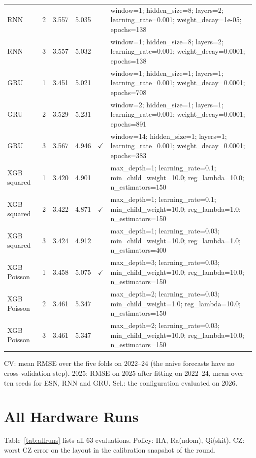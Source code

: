 \documentclass[journal]{IEEEtran}
\begin{document}
\begin{table}[t]
\begin{tabular}{@{}llcccp{11.4cm}@{}}
RNN & 2 & 3.557 & 5.035 &  & window=1; hidden\_size=8; layers=2; learning\_rate=0.001; weight\_decay=1e-05; epochs=138 \\
RNN & 3 & 3.557 & 5.032 &  & window=1; hidden\_size=8; layers=2; learning\_rate=0.001; weight\_decay=0.0001; epochs=138 \\
GRU & 1 & 3.451 & 5.021 &  & window=1; hidden\_size=1; layers=1; learning\_rate=0.001; weight\_decay=0.0001; epochs=708 \\
GRU & 2 & 3.529 & 5.231 &  & window=2; hidden\_size=1; layers=1; learning\_rate=0.001; weight\_decay=0.0001; epochs=891 \\
GRU & 3 & 3.567 & 4.946 & $\checkmark$ & window=14; hidden\_size=1; layers=1; learning\_rate=0.001; weight\_decay=0.0001; epochs=383 \\
XGB squared & 1 & 3.420 & 4.901 &  & max\_depth=1; learning\_rate=0.1; min\_child\_weight=10.0; reg\_lambda=10.0; n\_estimators=150 \\
XGB squared & 2 & 3.422 & 4.871 & $\checkmark$ & max\_depth=1; learning\_rate=0.1; min\_child\_weight=10.0; reg\_lambda=1.0; n\_estimators=150 \\
XGB squared & 3 & 3.424 & 4.912 &  & max\_depth=1; learning\_rate=0.03; min\_child\_weight=10.0; reg\_lambda=1.0; n\_estimators=400 \\
XGB Poisson & 1 & 3.458 & 5.075 & $\checkmark$ & max\_depth=3; learning\_rate=0.03; min\_child\_weight=10.0; reg\_lambda=10.0; n\_estimators=150 \\
XGB Poisson & 2 & 3.461 & 5.347 &  & max\_depth=2; learning\_rate=0.03; min\_child\_weight=1.0; reg\_lambda=10.0; n\_estimators=150 \\
XGB Poisson & 3 & 3.461 & 5.347 &  & max\_depth=2; learning\_rate=0.03; min\_child\_weight=10.0; reg\_lambda=10.0; n\_estimators=150 \\
\bottomrule
\end{tabular}

\smallskip
\parbox{\textwidth}{\footnotesize CV: mean RMSE over the five folds on 2022--24 (the naive forecasts have no cross-validation step). 2025: RMSE on 2025 after fitting on 2022--24, mean over ten seeds for ESN, RNN and GRU. Sel.: the configuration evaluated on 2026.}

\end{table}

\section{All Hardware Runs}
Table~\ref{tab:allruns} lists all 63 evaluations. Policy: HA, Ra(ndom), Qi(skit). CZ: worst CZ error on the layout in the calibration snapshot of the round.
\end{document}
